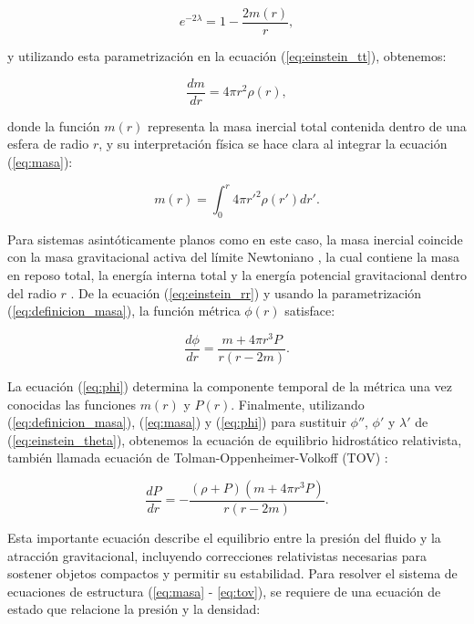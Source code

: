 \begin{equation}
	e^{-2\lambda} = 1 - \frac{2m(r)}{r},
	\label{eq:definicion_masa}
\end{equation}

y utilizando esta parametrización en la ecuación (\ref{eq:einstein_tt}), obtenemos:

\begin{equation}
	\frac{dm}{dr} = 4\pi r^2 \rho(r),
	\label{eq:masa}
\end{equation}

donde la función $m(r)$ representa la masa inercial total contenida dentro de una esfera de radio $r$, y su interpretación física se hace clara al integrar la ecuación (\ref{eq:masa}):

\begin{equation*}
	m(r) = \int_0^r 4\pi r'^2 \rho(r') dr'.
\end{equation*}

Para sistemas asintóticamente planos como en este caso, la masa inercial coincide con la masa gravitacional activa del límite Newtoniano \cite{vollickMeaningVariousMass2021}, la cual contiene la masa en reposo total, la energía interna total y la energía potencial gravitacional dentro del radio $r$ \cite{misnerGravitation2017}. De la ecuación (\ref{eq:einstein_rr}) y usando la parametrización (\ref{eq:definicion_masa}), la función métrica $\phi(r)$ satisface:

\begin{equation}
	\frac{d\phi}{dr} = \frac{m + 4\pi r^3 P}{r(r - 2m)}.
	\label{eq:phi}
\end{equation}

La ecuación (\ref{eq:phi}) determina la componente temporal de la métrica una vez conocidas las funciones $m(r)$ y $P(r)$. Finalmente, utilizando (\ref{eq:definicion_masa}), (\ref{eq:masa}) y (\ref{eq:phi}) para sustituir $\phi''$, $\phi'$ y $\lambda'$ de (\ref{eq:einstein_theta}), obtenemos la ecuación de equilibrio hidrostático relativista, también llamada ecuación de Tolman-Oppenheimer-Volkoff (TOV) \cite{oppenheimerMassiveNeutronCores1939}:

\begin{equation}
	\frac{dP}{dr} = -\frac{(\rho + P)(m + 4\pi r^3 P)}{r(r - 2m)}.
	\label{eq:tov}
\end{equation}

Esta importante ecuación describe el equilibrio entre la presión del fluido y la atracción gravitacional, incluyendo correcciones relativistas necesarias para sostener objetos compactos y permitir su estabilidad. Para resolver el sistema de ecuaciones de estructura (\ref{eq:masa} - \ref{eq:tov}), se requiere de una ecuación de estado que relacione la presión y la densidad:

